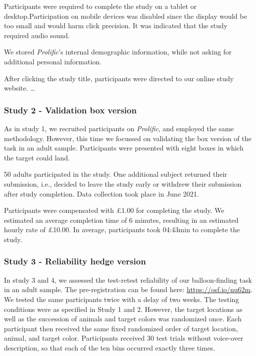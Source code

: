 \documentclass[
  english,
  man,floatsintext]{apa6}
\begin{document}
Participants were required to complete the study on a tablet or desktop.Participation on mobile devices was disabled since the display would be too small and would harm click precision. It was indicated that the study required audio sound.

We stored \emph{Prolific}'s internal demographic information,
while not asking for additional personal information.

After clicking the study title, participants were directed to our online study website.
\ldots{}

\hypertarget{study-2---validation-box-version}{%
\subsubsection{Study 2 - Validation box version}\label{study-2---validation-box-version}}

As in study 1, we recruited participants on \emph{Prolific}, and employed the same methodology. However, this time we focussed on validating the box version of the task in an adult sample. Participants were presented with eight boxes in which the target could land.

50 adults participated in the study. One additional subject returned their submission, i.e., decided to leave the study early or withdrew their submission after study completion. Data collection took place in June 2021.

Participants were compensated with £1.00 for completing the study. We estimated an average completion time of 6 minutes, resulting in an estimated hourly rate of £10.00. In average, participants took 04:43min to complete the study.

\hypertarget{study-3---reliability-hedge-version}{%
\subsubsection{Study 3 - Reliability hedge version}\label{study-3---reliability-hedge-version}}

In study 3 and 4, we assessed the test-retest reliability of our balloon-finding task in an adult sample. The pre-registration can be found here: \url{https://osf.io/nu62m}. We tested the same participants twice with a delay of two weeks. The testing conditions were as specified in Study 1 and 2. However, the target locations as well as the succession of animals and target colors was randomized once. Each participant then received the same fixed randomized order of target location, animal, and target color. Participants received 30 test trials without voice-over description, so that each of the ten bins occurred exactly three times.
\end{document}
